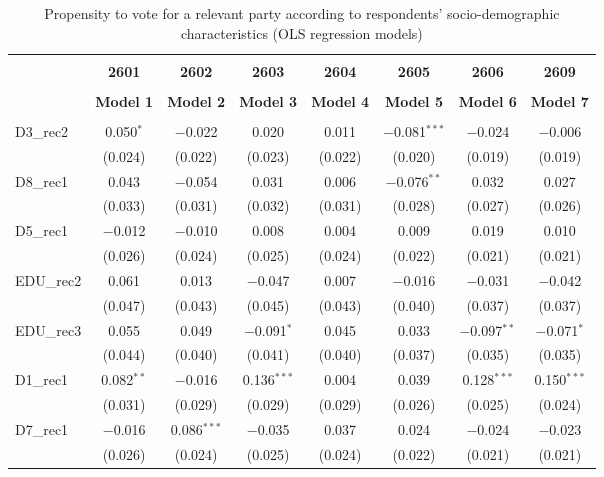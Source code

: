 \documentclass[
]{article}
\begin{document}
\begin{table}[!htbp] \centering 
  \caption{Propensity to vote for a relevant party according to respondents' 
                     socio-demographic characteristics (OLS regression models)} 
  \label{table:full_ols_es} 
\begin{tabular}{@{\extracolsep{5pt}}lccccccc} 
\\[-1.8ex]\hline \\[-1.8ex] 
 & \textbf{2601} & \textbf{2602} & \textbf{2603} & \textbf{2604} & \textbf{2605} & \textbf{2606} & \textbf{2609} \\ 
\\[-1.8ex] & \textbf{Model 1} & \textbf{Model 2} & \textbf{Model 3} & \textbf{Model 4} & \textbf{Model 5} & \textbf{Model 6} & \textbf{Model 7}\\ 
\hline \\[-1.8ex] 
 D3\_rec2 & 0.050$^{*}$ & $-$0.022 & 0.020 & 0.011 & $-$0.081$^{***}$ & $-$0.024 & $-$0.006 \\ 
  & (0.024) & (0.022) & (0.023) & (0.022) & (0.020) & (0.019) & (0.019) \\ 
  D8\_rec1 & 0.043 & $-$0.054 & 0.031 & 0.006 & $-$0.076$^{**}$ & 0.032 & 0.027 \\ 
  & (0.033) & (0.031) & (0.032) & (0.031) & (0.028) & (0.027) & (0.026) \\ 
  D5\_rec1 & $-$0.012 & $-$0.010 & 0.008 & 0.004 & 0.009 & 0.019 & 0.010 \\ 
  & (0.026) & (0.024) & (0.025) & (0.024) & (0.022) & (0.021) & (0.021) \\ 
  EDU\_rec2 & 0.061 & 0.013 & $-$0.047 & 0.007 & $-$0.016 & $-$0.031 & $-$0.042 \\ 
  & (0.047) & (0.043) & (0.045) & (0.043) & (0.040) & (0.037) & (0.037) \\ 
  EDU\_rec3 & 0.055 & 0.049 & $-$0.091$^{*}$ & 0.045 & 0.033 & $-$0.097$^{**}$ & $-$0.071$^{*}$ \\ 
  & (0.044) & (0.040) & (0.041) & (0.040) & (0.037) & (0.035) & (0.035) \\ 
  D1\_rec1 & 0.082$^{**}$ & $-$0.016 & 0.136$^{***}$ & 0.004 & 0.039 & 0.128$^{***}$ & 0.150$^{***}$ \\ 
  & (0.031) & (0.029) & (0.029) & (0.029) & (0.026) & (0.025) & (0.024) \\ 
  D7\_rec1 & $-$0.016 & 0.086$^{***}$ & $-$0.035 & 0.037 & 0.024 & $-$0.024 & $-$0.023 \\ 
  & (0.026) & (0.024) & (0.025) & (0.024) & (0.022) & (0.021) & (0.021) \\ 

\end{tabular}
\end{table}
\end{document}
